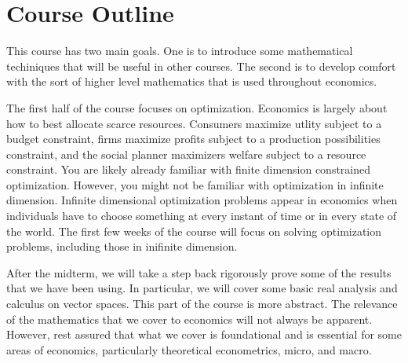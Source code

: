 \documentclass[10pt]{article}
\begin{document}
\section{Course Outline}

This course has two main goals. One is to introduce some mathematical
techiniques that will be useful in other courses. The second is to
develop comfort with the sort of higher level mathematics that is used
throughout economics. 

The first half of the course focuses on optimization. Economics is
largely about how to best allocate scarce resources. Consumers
maximize utlity subject to a budget constraint, firms maximize profits
subject to a production possibilities constraint, and the social
planner maximizers welfare subject to a resource constraint. You are
likely already familiar with finite dimension constrained
optimization. However, you might not be familiar with optimization in
infinite dimension. Infinite dimensional optimization problems appear
in economics when individuals have to choose something at every
instant of time or in every state of the world. The first few weeks of
the course will focus on solving optimization problems, including
those in inifinite dimension. 

After the midterm, we will take a step back rigorously prove some of
the results that we have been using. In particular, we will cover some
basic real analysis and calculus on vector spaces. This part of the
course is more abstract. The relevance of the mathematics that we
cover to economics will not always be apparent. However, rest assured
that what we cover is foundational and is essential for some areas of
economics, particularly theoretical econometrics, micro, and macro. 
\end{document}
